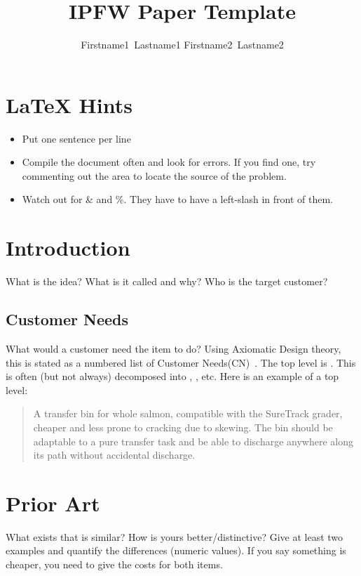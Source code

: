 \documentclass[draft]{ipfwreport}
\author{Firstname1~Lastname1\formatemail{email11} Firstname2~Lastname2\formatemail{email2}}
\title{IPFW Paper Template}  %
\begin{document}
\maketitle  %
\listoffixmes{}

\section*{\LaTeX{} Hints}
\begin{itemize}
\item Put one sentence per line
\item Compile the document often and look for errors.
  If you find one, try commenting out the area to locate the source of the problem.
\item Watch out for \& and \%.  They have to have a left-slash in front of them.
\end{itemize}

\section{Introduction}
What is the idea?  What is it called and why?
Who is the target customer?

\subsection{Customer Needs}
What would a customer need the item to do?  
Using Axiomatic Design theory, this is stated as a numbered list of Customer Needs(CN)~\cite{suh1990principles}.
The top level is .
This is often (but not always) decomposed into , , etc.
Here is an example of a top level:

\begin{quote} \textbf{} A transfer bin for whole salmon, compatible with the SureTrack grader, cheaper and less prone to cracking due to skewing.  
The bin should be adaptable to a pure transfer task and be able to discharge anywhere along its path without
accidental discharge.~\cite{gerhard2016suretrack}
\end{quote}


\section{Prior Art}
What exists that is similar?  How is yours better/distinctive?
Give at least two examples and quantify the differences (numeric values).
If you say something is cheaper, you need to give the costs for both items.
\end{document}
